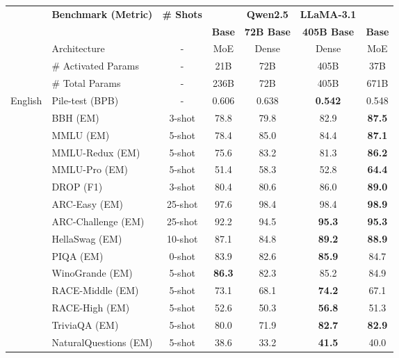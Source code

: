 \begin{table}[!h]
    \centering
    \footnotesize
    \setlength{\tabcolsep}{4.5pt}
    \begin{tabular}{@{}c l c | c | c c | c@{}}
    \toprule
    & \multirow{2}{*}{\centering \textbf{Benchmark {\tiny (Metric)}}} & \multirow{2}{*}{\textbf{\# Shots}} & \textbf{\dsvii{}} & \textbf{Qwen2.5} & \textbf{LLaMA-3.1} & \textbf{\dsviii{}} \\
    & & & \textbf{Base} & \textbf{72B Base} & \textbf{405B Base} & \textbf{Base} \\
    \midrule
    & Architecture & - & MoE & Dense & Dense & MoE \\
    & \# Activated Params & - & 21B & 72B & 405B & 37B \\
    & \# Total Params & - & 236B & 72B & 405B & 671B \\
    \midrule
    \multirow{16}{*}{English} & Pile-test {\tiny (BPB)} & - & 0.606 & 0.638 & \textbf{0.542} & 0.548 \\
    & BBH {\tiny (EM)} & 3-shot & 78.8 & 79.8 & 82.9 & \textbf{87.5} \\
    & MMLU {\tiny (EM)} & 5-shot & 78.4 & 85.0 & 84.4 & \textbf{87.1} \\
    & MMLU-Redux {\tiny (EM)} & 5-shot & 75.6 & 83.2 & 81.3 & \textbf{86.2} \\
    & MMLU-Pro {\tiny (EM)} & 5-shot & 51.4 & 58.3 & 52.8 & \textbf{64.4} \\
    & DROP {\tiny (F1)} & 3-shot & 80.4 & 80.6 & 86.0 & \textbf{89.0} \\
    & ARC-Easy {\tiny (EM)} & 25-shot & 97.6 & 98.4 & 98.4 & \textbf{98.9} \\
    & ARC-Challenge {\tiny (EM)} & 25-shot & 92.2 & 94.5 & \textbf{95.3} & \textbf{95.3} \\
    & HellaSwag {\tiny (EM)} & 10-shot & 87.1 & 84.8 & \textbf{89.2} & \textbf{88.9} \\
    & PIQA {\tiny (EM)} & 0-shot & 83.9 & 82.6 & \textbf{85.9} & 84.7 \\
    & WinoGrande {\tiny (EM)} & 5-shot & \textbf{86.3} & 82.3 & 85.2 & 84.9 \\
    & RACE-Middle {\tiny (EM)} & 5-shot & 73.1 & 68.1 & \textbf{74.2} & 67.1 \\
    & RACE-High {\tiny (EM)} & 5-shot & 52.6 & 50.3 & \textbf{56.8} & 51.3 \\
    & TriviaQA {\tiny (EM)} & 5-shot & 80.0 & 71.9 & \textbf{82.7} & \textbf{82.9} \\
    & NaturalQuestions {\tiny (EM)} & 5-shot & 38.6 & 33.2 & \textbf{41.5} & 40.0 \\

\end{tabular}
\end{table}
